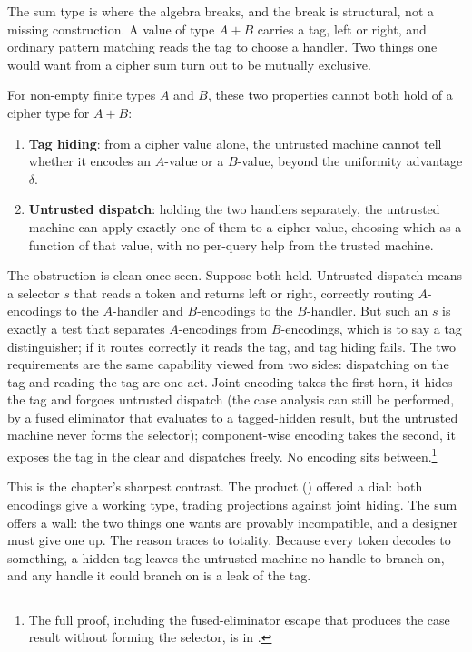 The sum type is where the algebra breaks, and the break is structural, not a
missing construction. A value of type $A + B$ carries a tag, left or right,
and ordinary pattern matching reads the tag to choose a handler. Two things
one would want from a cipher sum turn out to be mutually exclusive.

\begin{theorem}
\label{thm:sum-impossibility}
For non-empty finite types $A$ and $B$, these two properties cannot both
hold of a cipher type for $A + B$:
\begin{enumerate}
\item \textbf{Tag hiding}: from a cipher value alone, the untrusted machine
  cannot tell whether it encodes an $A$-value or a $B$-value, beyond the
  uniformity advantage $\delta$.
\item \textbf{Untrusted dispatch}: holding the two handlers separately, the
  untrusted machine can apply exactly one of them to a cipher value,
  choosing which as a function of that value, with no per-query help from the
  trusted machine.
\end{enumerate}
\end{theorem}

The obstruction is clean once seen. Suppose both held. Untrusted dispatch
means a selector $s$ that reads a token and returns left or right, correctly
routing $A$-encodings to the $A$-handler and $B$-encodings to the
$B$-handler. But such an $s$ is exactly a test that separates $A$-encodings
from $B$-encodings, which is to say a tag distinguisher; if it routes
correctly it reads the tag, and tag hiding fails. The two requirements are
the same capability viewed from two sides: dispatching on the tag and
reading the tag are one act. Joint encoding takes the first horn, it hides
the tag and forgoes untrusted dispatch (the case analysis can still be
performed, by a fused eliminator that evaluates to a tagged-hidden result,
but the untrusted machine never forms the selector); component-wise encoding
takes the second, it exposes the tag in the clear and dispatches freely. No
encoding sits between.\footnote{The full proof, including the fused-eliminator
escape that produces the case result without forming the selector, is in
\cite{towell2026algebraic}.}

This is the chapter's sharpest contrast. The product ()
offered a dial: both encodings give a working type, trading projections
against joint hiding. The sum offers a wall: the two things one wants are
provably incompatible, and a designer must give one up. The reason traces
to totality. Because every token decodes to something, a hidden tag leaves
the untrusted machine no handle to branch on, and any handle it could branch
on is a leak of the tag.

